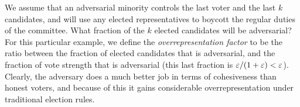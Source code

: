 We assume that an adversarial minority controls the last voter and the last $k$ candidates, and will use any elected representatives to boycott the regular duties of the committee. 
What fraction of the $k$ elected candidates will be adversarial? 
For this particular example, we define the \emph{overrepresentation factor} to be the ratio between the fraction of elected candidates that is adversarial, and the fraction of vote strength that is adversarial (this last fraction is $\varepsilon/(1+\varepsilon)<\varepsilon$).
Clearly, the adversary does a much better job in terms of cohesiveness than honest voters, and because of this it gains considerable overrepresentation under traditional election rules.

\begin{figure}[htb]
\begin{center}
\scalebox{.7}{

}
\end{center}
\end{figure}
